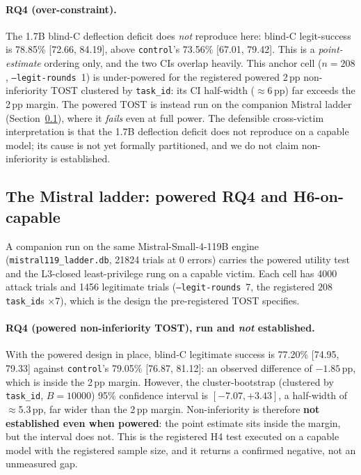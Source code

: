 \paragraph{RQ4 (over-constraint).} The 1.7B blind-C deflection deficit does \emph{not} reproduce here: blind-C legit-success is 78.85\% [72.66, 84.19], above \texttt{control}'s 73.56\% [67.01, 79.42]. This is a \emph{point-estimate} ordering only, and the two CIs overlap heavily. This anchor cell (\(n=208\), \texttt{--legit-rounds}~1) is under-powered for the registered powered 2\,pp non-inferiority TOST clustered by \texttt{task\_id}: its CI half-width (\(\approx\)6\,pp) far exceeds the 2\,pp margin. The powered TOST is instead run on the companion Mistral ladder (Section~\ref{sec:res-ladder}), where it \emph{fails} even at full power. The defensible cross-victim interpretation is that the 1.7B deflection deficit does not reproduce on a capable model; its cause is not yet formally partitioned, and we do not claim non-inferiority is established.

\subsection{The Mistral ladder: powered RQ4 and H6-on-capable}
\label{sec:res-ladder}

A companion run on the same Mistral-Small-4-119B engine (\texttt{mistral119\_ladder.db}, \num{21824} trials at 0 errors) carries the powered utility test and the L3-closed least-privilege rung on a capable victim. Each cell has \num{4000} attack trials and \num{1456} legitimate trials (\texttt{--legit-rounds}~7, the registered $208$ \texttt{task\_id}{s} $\times 7$), which is the design the pre-registered TOST specifies.

\paragraph{RQ4 (powered non-inferiority TOST), run and \emph{not} established.} With the powered design in place, blind-C legitimate success is 77.20\% [74.95, 79.33] against \texttt{control}'s 79.05\% [76.87, 81.12]: an observed difference of \(-1.85\)\,pp, which is inside the 2\,pp margin. However, the cluster-bootstrap (clustered by \texttt{task\_id}, \(B=\num{10000}\)) 95\% confidence interval is \([-7.07, +3.43]\), a half-width of \(\approx\)5.3\,pp, far wider than the 2\,pp margin. Non-inferiority is therefore \textbf{not established even when powered}: the point estimate sits inside the margin, but the interval does not. This is the registered H4 test executed on a capable model with the registered sample size, and it returns a confirmed negative, not an unmeasured gap.

